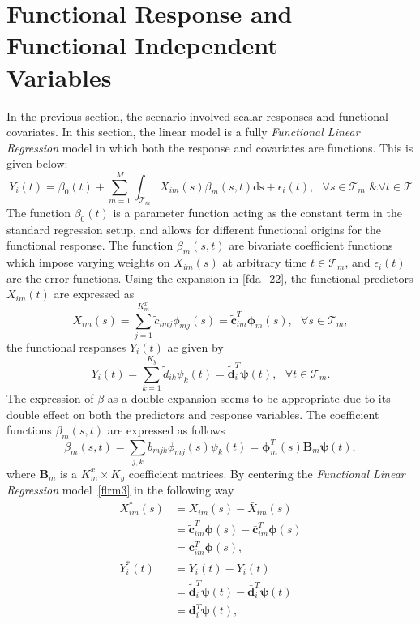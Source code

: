 \section{Functional Response and Functional Independent \\ Variables}\label{Funct_2}
In the previous section, the scenario involved scalar responses and functional covariates. In this section, the linear model is a fully \textit{Functional Linear Regression} model in which both the response and covariates are functions. This is given below:
\begin{equation}\label{flrm3}
Y_i(t) = \beta_{0} (t) + \sum_{m=1}^{M} \int_{\mathcal{T}_m} X_{im}(s) \beta_{m}(s,t)\mathrm{ds} + \epsilon_i(t), \text{ } \forall s \in \mathcal{T}_m \text{ \& } \forall t \in \mathcal{T} 
\end{equation}
The function $\beta_0(t)$ is a parameter function acting as the constant term in the standard regression setup, and allows for different functional origins for the functional response. The function $\beta_{m}(s,t)$ are bivariate coefficient functions which impose varying weights on $X_{im}(s)$ at arbitrary time $t \in \mathcal{T}_m$, and $\epsilon_i(t)$ are the error functions. Using the expansion in \eqref{fda_22}, the functional predictors $X_{i m}(t)$ are expressed as
\begin{equation}\label{eq:covariates_fun}
X_{i m}(s) = \sum_{j=1}^{K_m^{x}} \tilde{c}_{i m j} \phi_{m j} (s) = \tilde{\bm{c}}_{i m}^T \bm{\phi}_{m}(s),\text{ } \forall s \in \mathcal{T}_m,
\end{equation}
the functional responses $Y_i(t)$ ae given by
\begin{equation}\label{eq:response_fun}
Y_i(t) = \sum_{k=1}^{K_{y}} \tilde{d}_{ik} \psi_{k} (t) = \tilde{\bm{d}}_{i}^T \bm{\psi}(t),\text{ } \forall t \in \mathcal{T}_m.
\end{equation}
The expression of $\beta$ as a double expansion seems to be appropriate due to its double effect on both the predictors and response variables. The coefficient functions $\beta_m(s,t)$ are expressed as follows
\begin{equation}\label{beta_fun}
\beta_m(s,t) = \sum_{j,k} b_{mjk} \phi_{m j}(s) \psi_{k}(t) = \bm{\phi}^T_{m}(s) \bm{B}_m \bm{\psi}(t),
\end{equation}
where $\bm{B}_m$ is a $K_m^{x} \times K_{y}$ coefficient matrices. By centering the \textit{Functional Linear Regression} model~\eqref{flrm3} in the following way
\begin{align}
X^{*}_{im}(s) &= X_{im}(s) - \bar{X}_{im}(s) \nonumber \\
			  &= \tilde{\bm{c}}^T_{im} \bm{\phi}(s) - \bar{\bm{c}}^T_{im} \bm{\phi}(s) \nonumber \\
			  &= \bm{c}^T_{im} \bm{\phi}(s),\label{eq_cent1} \\
Y^{*}_i(t) &= Y_i(t) - \bar{Y}_i(t) \nonumber \\
		   &= \tilde{\bm{d}}_{i}^T \bm{\psi}(t) - \bar{\bm{d}}_{i}^T \bm{\psi}(t) \nonumber \\
		   &= \bm{d}_{i}^T \bm{\psi}(t) \label{eq_cent2},
\end{align}
